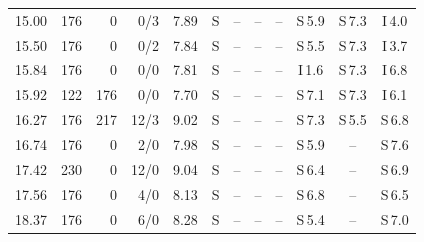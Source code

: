 \begin{tabular}{rrrrcc@{\hspace{1.2em}}ccc@{\hspace{1.2em}}ccc}
15.00 & 176 & 0 & 0/3 & 7.89 & S & -- & -- & -- & S\,{\scriptsize 5.9} & S\,{\scriptsize 7.3} & I\,{\scriptsize 4.0} \\
15.50 & 176 & 0 & 0/2 & 7.84 & S & -- & -- & -- & S\,{\scriptsize 5.5} & S\,{\scriptsize 7.3} & I\,{\scriptsize 3.7} \\
15.84 & 176 & 0 & 0/0 & 7.81 & S & -- & -- & -- & I\,{\scriptsize 1.6} & S\,{\scriptsize 7.3} & I\,{\scriptsize 6.8} \\
15.92 & 122 & 176 & 0/0 & 7.70 & S & -- & -- & -- & S\,{\scriptsize 7.1} & S\,{\scriptsize 7.3} & I\,{\scriptsize 6.1} \\
16.27 & 176 & 217 & 12/3 & 9.02 & S & -- & -- & -- & S\,{\scriptsize 7.3} & S\,{\scriptsize 5.5} & S\,{\scriptsize 6.8} \\
16.74 & 176 & 0 & 2/0 & 7.98 & S & -- & -- & -- & S\,{\scriptsize 5.9} & -- & S\,{\scriptsize 7.6} \\
17.42 & 230 & 0 & 12/0 & 9.04 & S & -- & -- & -- & S\,{\scriptsize 6.4} & -- & S\,{\scriptsize 6.9} \\
17.56 & 176 & 0 & 4/0 & 8.13 & S & -- & -- & -- & S\,{\scriptsize 6.8} & -- & S\,{\scriptsize 6.5} \\
18.37 & 176 & 0 & 6/0 & 8.28 & S & -- & -- & -- & S\,{\scriptsize 5.4} & -- & S\,{\scriptsize 7.0} \\
\bottomrule
\end{tabular}
